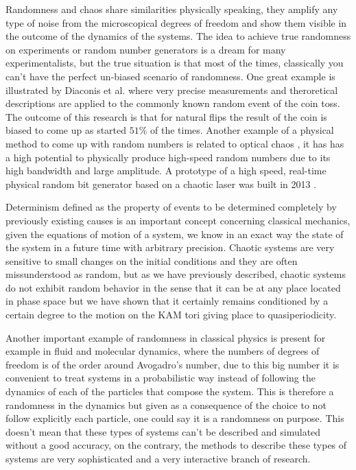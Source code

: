Randomness and chaos share similarities physically speaking, they amplify any type of noise from the microscopical degrees of freedom and show them visible in the outcome of the dynamics of the systems. The idea to achieve true randomness on experiments or random number generators is a dream for many experimentalists, but the true situation is that most of the times, classically you can't have the perfect un-biased scenario of randomness. One great example is illustrated by Diaconis et al. \cite{diaconis2007dynamical} where very precise measurements and theroretical descriptions are applied to the commonly known random event of the coin toss. The outcome of this research is that for natural flips the result of the coin is biased to come up as started $51\%$ of the times. Another example of a physical method to come up with random numbers is related to optical chaos \cite{li2010all}\cite{li2016fully}, it has  has a high potential to physically produce high-speed random numbers due to its high bandwidth and large amplitude. A prototype of a high speed, real-time physical random bit generator based on a chaotic laser was built in 2013 \cite{wang20134}.\par


Determinism defined as the property of events to be determined completely by previously existing causes is an important concept concerning classical mechanics, given the equations of motion of a system, we know in an exact way the state of the system in a future time with arbitrary precision. Chaotic systems are very sensitive to small changes on the initial conditions and they are often missunderstood as random, but as we have previously described, chaotic systems do not exhibit random behavior in the sense that it can be at any place located in phase space but we have shown that it certainly remains conditioned by a certain degree to the motion on the KAM tori giving place to quasiperiodicity.\par 

Another important example of randomness in classical physics is present for example in fluid and molecular dynamics, where the numbers of degrees of freedom is of the order around Avogadro's number, due to this big number it is convenient to treat systems in a probabilistic way instead of following the dynamics of each of the particles that compose the system. This is therefore a randomness in the dynamics but given as a consequence of the choice to not follow explicitly each particle, one could say it is a randomness on purpose. This doesn't mean that these types of systems can't be described and simulated without a good accuracy, on the contrary, the methods to describe these types of systems are very sophisticated and a very interactive branch of research\cite{ghil2012topics}\cite{liu2008location}.

